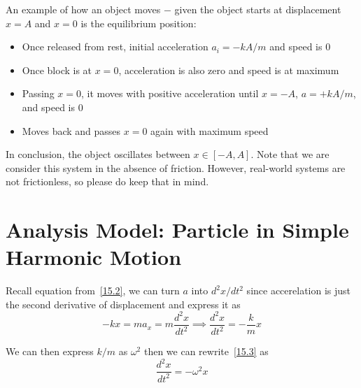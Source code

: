 An example of how an object moves $-$ given the object starts at displacement $x=A$ and $x=0$ is the
equilibrium position:
\begin{itemize}
    \item Once released from rest, initial acceleration $a_i = -kA/m$ and speed is 0
    \item Once block is at $x=0$, acceleration is also zero and speed is at maximum
    \item Passing $x=0$, it moves with positive acceleration until $x=-A$, $a = +kA/m$, and speed is 0
    \item Moves back and passes $x=0$ again with maximum speed
\end{itemize}

In conclusion, the object oscillates between $x \in [-A, A]$. Note that we are consider this system
in the absence of friction. However, real-world systems are not frictionless, so please do keep that in mind.

\section{Analysis Model: Particle in Simple Harmonic Motion}

Recall equation from~\eqref{15.2}, we can turn $a$ into $d^2x / dt^2$ since accerelation is just
the second derivative of displacement and express it as
\begin{equation}\label{15.3}
-kx = ma_x = m\frac{d^2x}{dt^2} \implies \frac{d^2x}{dt^2} = -\frac{k}{m}x
\end{equation}

We can then express $k/m$ as $\omega^2$ then we can rewrite~\eqref{15.3} as 
\begin{equation}\label{15.5}
    \frac{d^2x}{dt^2} = - \omega^2 x
\end{equation}

